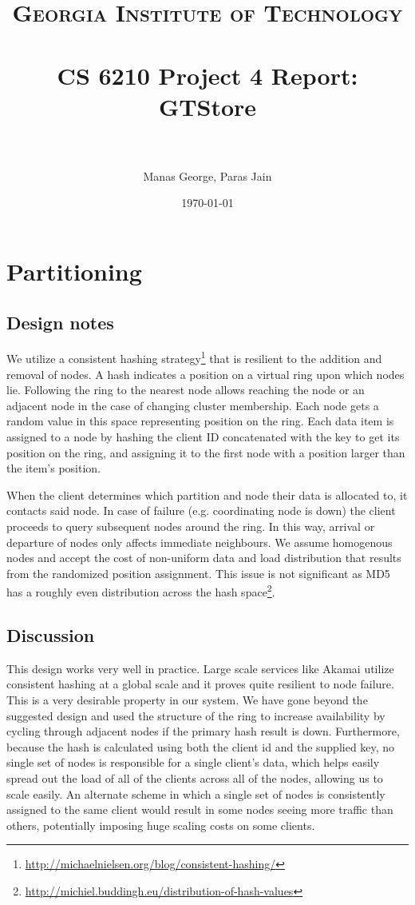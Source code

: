 \documentclass[paper=a4,fontsize=11pt]{report} %
\title{	
\normalfont \normalsize 
\textsc{Georgia Institute of Technology} \\ [25pt] %
\horrule{0.5pt} \\[0.4cm] %
\huge CS 6210 Project 4 Report: GTStore \\ %
\horrule{2pt} \\[0.5cm] %
}
\author{Manas George, Paras Jain} %
\date{\normalsize\today} %
\numberwithin{equation}{section} %
\numberwithin{figure}{section} %
\numberwithin{table}{section} %
\begin{document}
\maketitle %

\section{Partitioning}
\label{partitioning}
\subsection{Design notes}
We utilize a consistent hashing strategy\footnote{\url{http://michaelnielsen.org/blog/consistent-hashing/}} that is resilient to the addition and removal of nodes. A hash indicates a position on a virtual ring upon which nodes lie. Following the ring to the nearest node allows reaching the node or an adjacent node in the case of changing cluster membership. Each node gets a random value in this space representing position on the ring. Each data item is assigned to a node by hashing the client ID concatenated with the key to get its position on the ring, and assigning it to the first node with a position larger than the item's position.

When the client determines which partition and node their data is allocated to, it contacts said node. In case of failure (e.g. coordinating node is down) the client proceeds to query subsequent nodes around the ring. In this way, arrival or departure of nodes only affects immediate neighbours. We assume homogenous nodes and accept the cost of non-uniform data and load distribution that results from the randomized position assignment. This issue is not significant as MD5 has a roughly even distribution across the hash space\footnote{\url{http://michiel.buddingh.eu/distribution-of-hash-values}}.

\subsection{Discussion}
This design works very well in practice. Large scale services like Akamai utilize consistent hashing at a global scale and it proves quite resilient to node failure. This is a very desirable property in our system. We have gone beyond the suggested design and used the structure of the ring to increase availability by cycling through adjacent nodes if the primary hash result is down. Furthermore, because the hash is calculated using both the client id and the supplied key, no single set of nodes is responsible for a single client's data, which helps easily spread out the load of all of the clients across all of the nodes, allowing us to scale easily. An alternate scheme in which a single set of nodes is consistently assigned to the same client would result in some nodes seeing more traffic than others, potentially imposing huge scaling costs on some clients. 
\end{document}
